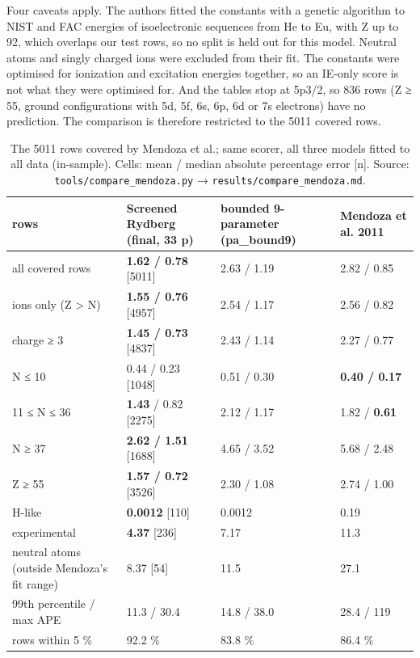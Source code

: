 \documentclass[aps,pra,preprint,superscriptaddress,amsmath,amssymb]{revtex4-2}
\begin{document}
Four caveats apply. The authors fitted the constants with a genetic algorithm to NIST and FAC energies of isoelectronic sequences from He to Eu, with Z up to 92, which overlaps our test rows, so no split is held out for this model. Neutral atoms and singly charged ions were excluded from their fit. The constants were optimised for ionization and excitation energies together, so an IE-only score is not what they were optimised for. And the tables stop at 5p3/2, so 836 rows (Z ≥ 55, ground configurations with 5d, 5f, 6s, 6p, 6d or 7s electrons) have no prediction. The comparison is therefore restricted to the 5011 covered rows.


\begin{table}[htbp]
\caption{The 5011 rows covered by Mendoza et al.; same scorer, all three models fitted to all data (in-sample). Cells: mean / median absolute percentage error [n]. Source: \texttt{tools/compare\_mendoza.py} → \texttt{results/compare\_mendoza.md}.}
\footnotesize
\begin{ruledtabular}
\begin{tabular}{llll}
rows & Screened Rydberg (final, 33 p) & bounded 9-parameter (pa\_bound9) & Mendoza et al. 2011 \\
\hline
all covered rows & \textbf{1.62 / 0.78} [5011] & 2.63 / 1.19 & 2.82 / 0.85 \\
ions only (Z > N) & \textbf{1.55 / 0.76} [4957] & 2.54 / 1.17 & 2.56 / 0.82 \\
charge ≥ 3 & \textbf{1.45 / 0.73} [4837] & 2.43 / 1.14 & 2.27 / 0.77 \\
N ≤ 10 & 0.44 / 0.23 [1048] & 0.51 / 0.30 & \textbf{0.40 / 0.17} \\
11 ≤ N ≤ 36 & \textbf{1.43} / 0.82 [2275] & 2.12 / 1.17 & 1.82 / \textbf{0.61} \\
N ≥ 37 & \textbf{2.62 / 1.51} [1688] & 4.65 / 3.52 & 5.68 / 2.48 \\
Z ≥ 55 & \textbf{1.57 / 0.72} [3526] & 2.30 / 1.08 & 2.74 / 1.00 \\
H-like & \textbf{0.0012} [110] & 0.0012 & 0.19 \\
experimental & \textbf{4.37} [236] & 7.17 & 11.3 \\
neutral atoms (outside Mendoza's fit range) & 8.37 [54] & 11.5 & 27.1 \\
99th percentile / max APE & 11.3 / 30.4 & 14.8 / 38.0 & 28.4 / 119 \\
rows within 5 \% & 92.2 \% & 83.8 \% & 86.4 \% \\
\end{tabular}
\end{ruledtabular}
\end{table}
\end{document}
